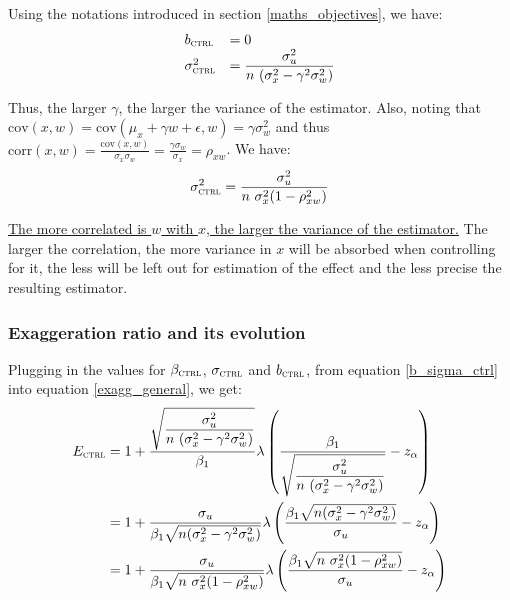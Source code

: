 \documentclass[a4paper, 11pt]{report}
\begin{document}
				Using the notations introduced in section \ref{maths_objectives}, we have:
				~
				\begin{equation}\label{b_sigma_ctrl}
					\begin{array}{lll}
						b_{\textsc{ctrl}} & = 0\\
					\sigma_{\textsc{ctrl}}^{2} & = \dfrac{\sigma_{u}^{2}}{n \ (\sigma_{x}^{2} - \gamma^{2}\sigma_{w}^{2})}
					\end{array}				
				\end{equation}
				
				Thus, the larger $\gamma$, the larger the variance of the estimator. Also, noting that $\text{cov}(x, w) = \text{cov}(\mu_{x} + \gamma w + \epsilon, w) = \gamma \sigma_{w}^{2}$ and thus $\text{corr}(x, w) = \frac{\text{cov}(x, w)}{\sigma_{x}\sigma_{w}} = \frac{\gamma\sigma_{w}}{\sigma_{x}} = \rho_{xw}$. We have:
				\[
					\sigma_{\textsc{ctrl}}^{2} = \dfrac{\sigma_{u}^{2}}{n \ \sigma_{x}^{2}(1 - \rho_{xw}^{2})}
				\]
				
				\ul{The more correlated is $w$ with $x$, the larger the variance of the estimator.} The larger the correlation, the more variance in $x$ will be absorbed when controlling for it, the less will be left out for estimation of the effect and the less precise the resulting estimator.
				
			\subsubsection{Exaggeration ratio and its evolution}
				
				Plugging in the values for $\beta_{\textsc{ctrl}}$, $\sigma_{\textsc{ctrl}}$ and $b_{\textsc{ctrl}}$, from equation \ref{b_sigma_ctrl} into equation \ref{exagg_general}, we get:
			~
			\begin{align*}
				E_{\textsc{ctrl}} 
				   & = 1 + 
				 \dfrac{\sqrt{\dfrac{\sigma_{u}^{2}}{n \ (\sigma_{x}^{2} - \gamma^{2}\sigma_{w}^{2})}}}{\beta_{1}}
				 \lambda \left( \dfrac{\beta_{1}}{\sqrt{\dfrac{\sigma_{u}^{2}}{n \ (\sigma_{x}^{2} - \gamma^{2}\sigma_{w}^{2})}}} - z_{\alpha} \right)\\
				 & = 1 + 
				 \dfrac{\sigma_{u}}{\beta_{1}\sqrt{n(\sigma_{x}^{2} - \gamma^{2}\sigma_{w}^{2})}}
				  \lambda \left( \dfrac{\beta_{1}\sqrt{n(\sigma_{x}^{2} - \gamma^{2}\sigma_{w}^{2})}}{\sigma_{u}} - z_{\alpha} \right)\\
				  & = 1 + 
				 \dfrac{\sigma_{u}}{\beta_{1}\sqrt{n \ \sigma_{x}^{2}(1 - \rho_{xw}^{2})}}
				  \lambda \left( \dfrac{\beta_{1}\sqrt{n \ \sigma_{x}^{2}(1 - \rho_{xw}^{2})}}{\sigma_{u}} - z_{\alpha} \right)
			\end{align*}
			
\end{document}

